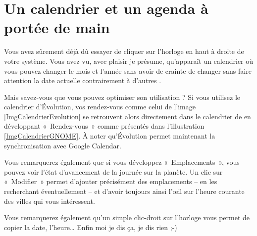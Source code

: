 \section{Un calendrier et un agenda à portée de main}
\label{RefCalendrierEvolution}
Vous avez sûrement déjà dû essayer de cliquer sur l'horloge en haut à droite de votre système. Vous avez vu, avec plaisir je présume, qu'apparaît un calendrier où vous pouvez changer le mois et l'année sans avoir de crainte de changer sans faire attention la date actuelle contrairement à d'autres .\par
Mais savez-vous que vous pouvez optimiser son utilisation ? Si vous utilisez le calendrier d'Évolution, vos rendez-vous comme celui de l'image \ref{ImgCalendrierEvolution} se retrouvent alors directement dans le calendrier de  en développant «~Rendez-vous~» comme présentés dans l'illustration \ref{ImgCalendrierGNOME}. À noter qu'Évolution permet maintenant la synchronisation avec Google Calendar.\par
{}
Vous remarquerez également que si vous développez «~Emplacements~», vous pouvez voir l'état d'avancement de la journée sur la planète. Un clic sur «~Modifier~» permet d'ajouter précisément des emplacements -- en les recherchant éventuellement -- et d'avoir toujours ainsi l'œil sur l'heure courante des villes qui vous intéressent.
\begin{nota}
Vous remarquerez également qu'un simple clic-droit sur l'horloge vous permet de copier la date, l'heure\ldots{} Enfin moi je dis ça, je dis rien ;-)
\end{nota}
